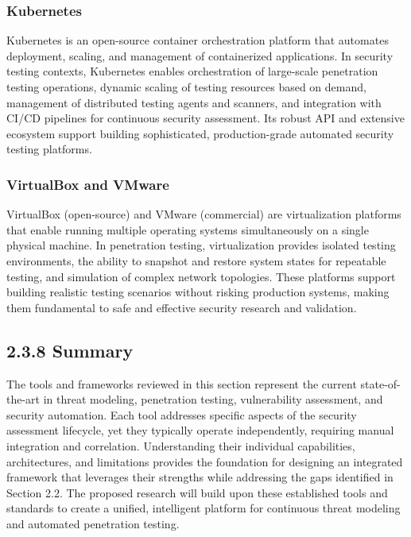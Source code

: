\documentclass[12pt,a4paper]{report}
\begin{document}
\subsubsection{Kubernetes}

Kubernetes is an open-source container orchestration platform that automates deployment, scaling, and management of containerized applications. In security testing contexts, Kubernetes enables orchestration of large-scale penetration testing operations, dynamic scaling of testing resources based on demand, management of distributed testing agents and scanners, and integration with CI/CD pipelines for continuous security assessment. Its robust API and extensive ecosystem support building sophisticated, production-grade automated security testing platforms.

\subsubsection{VirtualBox and VMware}

VirtualBox (open-source) and VMware (commercial) are virtualization platforms that enable running multiple operating systems simultaneously on a single physical machine. In penetration testing, virtualization provides isolated testing environments, the ability to snapshot and restore system states for repeatable testing, and simulation of complex network topologies. These platforms support building realistic testing scenarios without risking production systems, making them fundamental to safe and effective security research and validation.

\subsection{2.3.8 Summary}

The tools and frameworks reviewed in this section represent the current state-of-the-art in threat modeling, penetration testing, vulnerability assessment, and security automation. Each tool addresses specific aspects of the security assessment lifecycle, yet they typically operate independently, requiring manual integration and correlation. Understanding their individual capabilities, architectures, and limitations provides the foundation for designing an integrated framework that leverages their strengths while addressing the gaps identified in Section 2.2. The proposed research will build upon these established tools and standards to create a unified, intelligent platform for continuous threat modeling and automated penetration testing.
\end{document}
